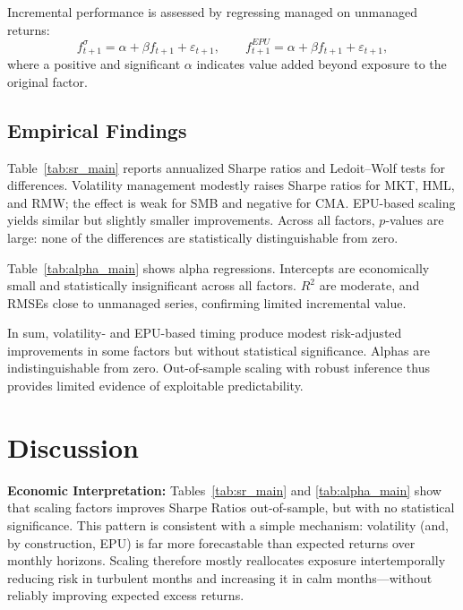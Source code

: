 Incremental performance is assessed by regressing managed on unmanaged returns:
\begin{equation}
f^{\sigma}_{t+1}=\alpha+\beta f_{t+1}+\varepsilon_{t+1},
\qquad
f^{EPU}_{t+1}=\alpha+\beta f_{t+1}+\varepsilon_{t+1},
\tag{4}
\end{equation}
where a positive and significant $\alpha$ indicates value added beyond exposure to the original factor.

\section{Empirical Findings}

Table~\ref{tab:sr_main} reports annualized Sharpe ratios and Ledoit–Wolf tests for differences. Volatility management modestly raises Sharpe ratios for \textsc{MKT}, \textsc{HML}, and \textsc{RMW}; the effect is weak for \textsc{SMB} and negative for \textsc{CMA}. EPU-based scaling yields similar but slightly smaller improvements. Across all factors, $p$-values are large: none of the differences are statistically distinguishable from zero.

Table~\ref{tab:alpha_main} shows alpha regressions. Intercepts are economically small and statistically insignificant across all factors. $R^2$ are moderate, and RMSEs close to unmanaged series, confirming limited incremental value.

In sum, volatility- and EPU-based timing produce modest risk-adjusted improvements in some factors but without statistical significance. Alphas are indistinguishable from zero. Out-of-sample scaling with robust inference thus provides limited evidence of exploitable predictability.

\chapter{Discussion}

\textbf{Economic Interpretation:} Tables~\ref{tab:sr_main} and \ref{tab:alpha_main} show that scaling factors improves Sharpe Ratios out-of-sample, but with no statistical significance. This pattern is consistent with a simple mechanism: volatility (and, by construction, EPU) is far more forecastable than expected returns over monthly horizons. Scaling therefore mostly reallocates exposure intertemporally reducing risk in turbulent months and increasing it in calm months—without reliably improving expected excess returns.

